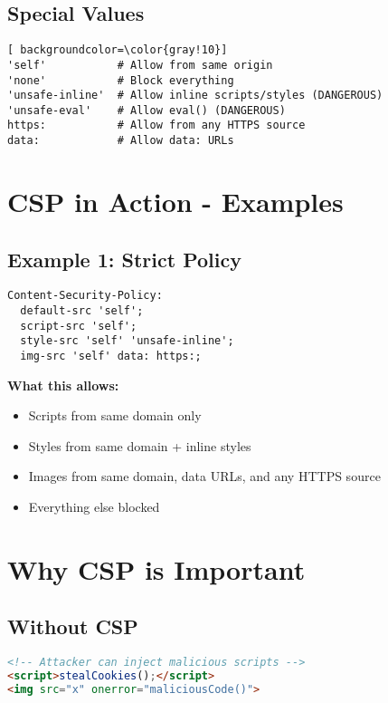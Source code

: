 \documentclass{article}
\begin{document}
\begin{itemize}
\subsection{Special Values}
\begin{lstlisting}[ backgroundcolor=\color{gray!10}]
'self'           # Allow from same origin
'none'           # Block everything
'unsafe-inline'  # Allow inline scripts/styles (DANGEROUS)
'unsafe-eval'    # Allow eval() (DANGEROUS)
https:           # Allow from any HTTPS source
data:            # Allow data: URLs
\end{lstlisting}

\section{CSP in Action - Examples}

\subsection{Example 1: Strict Policy}
\begin{lstlisting}[frame=single]
Content-Security-Policy: 
  default-src 'self';
  script-src 'self';
  style-src 'self' 'unsafe-inline';
  img-src 'self' data: https:;
\end{lstlisting}

\textbf{What this allows:}
\begin{itemize}
    \item  Scripts from same domain only
    \item  Styles from same domain + inline styles
    \item  Images from same domain, data URLs, and any HTTPS source
    \item  Everything else blocked
\end{itemize}

\section{Why CSP is Important}

\subsection{Without CSP}
\begin{lstlisting}[language=HTML, frame=single]
<!-- Attacker can inject malicious scripts -->
<script>stealCookies();</script>
<img src="x" onerror="maliciousCode()">
\end{lstlisting}


\end{itemize}
\end{document}
